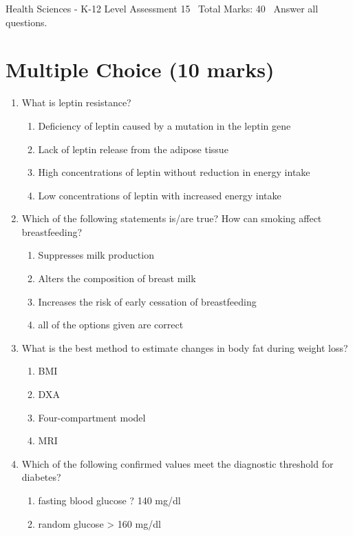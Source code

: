 \documentclass[12pt]{article}
\begin{document}
\begin{center}
Health Sciences - K-12 Level Assessment 15 \
Total Marks: 40 \
Answer all questions.
\end{center}

\section*{Multiple Choice (10 marks)}
\begin{enumerate}[label=\arabic*.]
\item What is leptin resistance?
\begin{enumerate}[label=(\alph*)]
    \item Deficiency of leptin caused by a mutation in the leptin gene
    \item Lack of leptin release from the adipose tissue
    \item High concentrations of leptin without reduction in energy intake
    \item Low concentrations of leptin with increased energy intake
\end{enumerate}
\item Which of the following statements is/are true? How can smoking affect breastfeeding?
\begin{enumerate}[label=(\alph*)]
    \item Suppresses milk production
    \item Alters the composition of breast milk
    \item Increases the risk of early cessation of breastfeeding
    \item all of the options given are correct
\end{enumerate}
\item What is the best method to estimate changes in body fat during weight loss?
\begin{enumerate}[label=(\alph*)]
    \item BMI
    \item DXA
    \item Four-compartment model
    \item MRI
\end{enumerate}
\item Which of the following confirmed values meet the diagnostic threshold for diabetes?
\begin{enumerate}[label=(\alph*)]
    \item fasting blood glucose ? 140 mg/dl
    \item random glucose \textgreater{} 160 mg/dl

\end{enumerate}
\end{enumerate}
\end{document}
